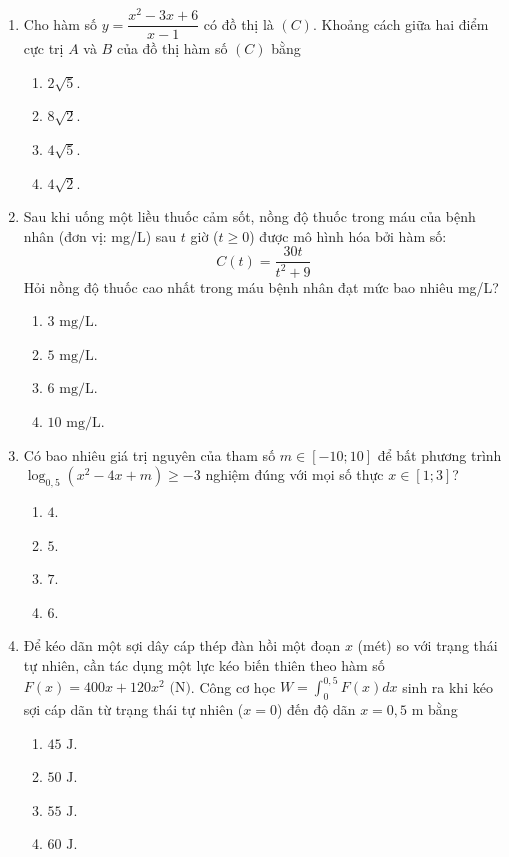 \documentclass[12pt,a4paper]{article}
\begin{document}
\begin{enumerate}[label=\textbf{Câu \arabic*:}, leftmargin=*]

\item Cho hàm số $y = \dfrac{x^2 - 3x + 6}{x - 1}$ có đồ thị là $(C)$. Khoảng cách giữa hai điểm cực trị $A$ và $B$ của đồ thị hàm số $(C)$ bằng
\begin{enumerate}[label=\Alph*.]
    \item $2\sqrt{5}$.
    \item $8\sqrt{2}$.
    \item $4\sqrt{5}$.
    \item $4\sqrt{2}$.
\end{enumerate}

\item Sau khi uống một liều thuốc cảm sốt, nồng độ thuốc trong máu của bệnh nhân (đơn vị: mg/L) sau $t$ giờ ($t \ge 0$) được mô hình hóa bởi hàm số:
$$C(t) = \dfrac{30t}{t^2 + 9}$$
Hỏi nồng độ thuốc cao nhất trong máu bệnh nhân đạt mức bao nhiêu mg/L?
\begin{enumerate}[label=\Alph*.]
    \item $3\text{ mg/L}$.
    \item $5\text{ mg/L}$.
    \item $6\text{ mg/L}$.
    \item $10\text{ mg/L}$.
\end{enumerate}

\item Có bao nhiêu giá trị nguyên của tham số $m \in [-10; 10]$ để bất phương trình $\log_{0{,}5}(x^2 - 4x + m) \ge -3$ nghiệm đúng với mọi số thực $x \in [1; 3]$?
\begin{enumerate}[label=\Alph*.]
    \item $4$.
    \item $5$.
    \item $7$.
    \item $6$.
\end{enumerate}

\item Để kéo dãn một sợi dây cáp thép đàn hồi một đoạn $x$ (mét) so với trạng thái tự nhiên, cần tác dụng một lực kéo biến thiên theo hàm số $F(x) = 400x + 120x^2\text{ (N)}$. Công cơ học $W = \int_0^{0{,}5} F(x) dx$ sinh ra khi kéo sợi cáp dãn từ trạng thái tự nhiên ($x = 0$) đến độ dãn $x = 0{,}5\text{ m}$ bằng
\begin{enumerate}[label=\Alph*.]
    \item $45\text{ J}$.
    \item $50\text{ J}$.
    \item $55\text{ J}$.
    \item $60\text{ J}$.
\end{enumerate}


\end{enumerate}
\end{document}
